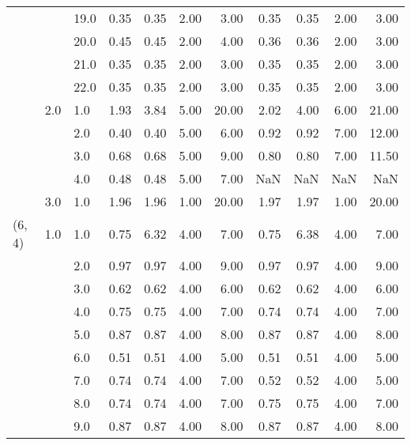 \begin{tabular}{lllrrrrrrrr}
       &     & 19.0 &       0.35 &      0.35 & 2.00 &   3.00 &       0.35 &      0.35 & 2.00 &   3.00 \\
       &     & 20.0 &       0.45 &      0.45 & 2.00 &   4.00 &       0.36 &      0.36 & 2.00 &   3.00 \\
       &     & 21.0 &       0.35 &      0.35 & 2.00 &   3.00 &       0.35 &      0.35 & 2.00 &   3.00 \\
       &     & 22.0 &       0.35 &      0.35 & 2.00 &   3.00 &       0.35 &      0.35 & 2.00 &   3.00 \\
       & 2.0 & 1.0  &       1.93 &      3.84 & 5.00 &  20.00 &       2.02 &      4.00 & 6.00 &  21.00 \\
       &     & 2.0  &       0.40 &      0.40 & 5.00 &   6.00 &       0.92 &      0.92 & 7.00 &  12.00 \\
       &     & 3.0  &       0.68 &      0.68 & 5.00 &   9.00 &       0.80 &      0.80 & 7.00 &  11.50 \\
       &     & 4.0  &       0.48 &      0.48 & 5.00 &   7.00 &        NaN &       NaN &  NaN &    NaN \\
       & 3.0 & 1.0  &       1.96 &      1.96 & 1.00 &  20.00 &       1.97 &      1.97 & 1.00 &  20.00 \\
(6, 4) & 1.0 & 1.0  &       0.75 &      6.32 & 4.00 &   7.00 &       0.75 &      6.38 & 4.00 &   7.00 \\
       &     & 2.0  &       0.97 &      0.97 & 4.00 &   9.00 &       0.97 &      0.97 & 4.00 &   9.00 \\
       &     & 3.0  &       0.62 &      0.62 & 4.00 &   6.00 &       0.62 &      0.62 & 4.00 &   6.00 \\
       &     & 4.0  &       0.75 &      0.75 & 4.00 &   7.00 &       0.74 &      0.74 & 4.00 &   7.00 \\
       &     & 5.0  &       0.87 &      0.87 & 4.00 &   8.00 &       0.87 &      0.87 & 4.00 &   8.00 \\
       &     & 6.0  &       0.51 &      0.51 & 4.00 &   5.00 &       0.51 &      0.51 & 4.00 &   5.00 \\
       &     & 7.0  &       0.74 &      0.74 & 4.00 &   7.00 &       0.52 &      0.52 & 4.00 &   5.00 \\
       &     & 8.0  &       0.74 &      0.74 & 4.00 &   7.00 &       0.75 &      0.75 & 4.00 &   7.00 \\
       &     & 9.0  &       0.87 &      0.87 & 4.00 &   8.00 &       0.87 &      0.87 & 4.00 &   8.00 \\

\end{tabular}

